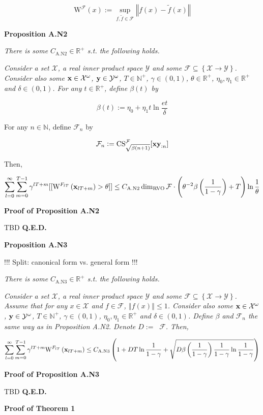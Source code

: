\documentclass[a4paper]{article}
\newcommand{\Co}[1]{}
\newcommand{\AP}[1]{\left(#1\right)}
\newcommand{\AC}[1]{\left\{#1\right\}}
\newcommand{\Nats}{\mathbb{N}}
\newcommand{\Reals}{\mathbb{R}}
\newcommand{\Norm}[1]{\left\Vert #1 \right\Vert}
\newcommand{\X}{\mathcal{X}}
\newcommand{\Y}{\mathcal{Y}}
\newcommand{\F}{\mathcal{F}}
\DeclareMathOperator{\RVO}{\dim_{RVO}}
\newcommand{\CS}{\mathrm{CS}}
\newcommand{\W}{\mathrm{W}}
\begin{document}
$$\W^\F(x):=\sup_{f,\tilde{f}\in\F}\Norm{f(x)-\tilde{f}(x)}$$  

\textbf{Proposition A.N2}\Co{b}

\textit{There is some $C_{\mathrm{A.N2}}\in\Reals^+$ s.t. the following holds.}\Co{i}

\textit{Consider a set $\X$, a real inner product space $\Y$ and some $\F\subseteq\AC{\X\rightarrow\Y}$. Consider also some $\bold{x}\in\X^\omega$, $\bold{y}\in\Y^\omega$, $T\in\Nats^+$, $\gamma\in(0,1)$, $\theta\in\Reals^+$, $\eta_0,\eta_1\in\Reals^+$ and $\delta\in(0,1)$. For any $t\in\Reals^+$, define $\beta(t)$ by}\Co{i}

$$\beta(t):=\eta_0 + \eta_1t\ln{\frac{et}{\delta}}$$

For any $n\in\Nats$, define $\F_n$ by

$$\F_n:=\CS^\F_{\sqrt{\beta(n+1)}}[\bold{xy}_{:n}]$$

Then,

$$\sum_{l=0}^\infty\sum_{m=0}^{T-1}{\gamma^{lT+m}[[\W^{F_{lT}}\AP{\bold{x}_{lT+m}}>\theta]]} \leq C_{\mathrm{A.N2}}\RVO{\F}\cdot\AP{\theta^{-2}\beta\AP{\frac{1}{1-\gamma}}+T}\ln{\frac{1}{\theta}}$$

\textbf{Proof of Proposition A.N2}\Co{b}

TBD \textbf{Q.E.D.}\Co{b}

\textbf{Proposition A.N3}\Co{b}

!!! Split: canonical form vs. general form !!!

\textit{There is some $C_{\mathrm{A.N3}}\in\Reals^+$ s.t. the following holds.}\Co{i}

\textit{Consider a set $\X$, a real inner product space $\Y$ and some $\F\subseteq\AC{\X\rightarrow\Y}$. Assume that for any $x\in\X$ and $f\in\F$, $\Norm{f(x)}\leq 1$. Consider also some $\bold{x}\in\X^\omega$, $\bold{y}\in\Y^\omega$, $T\in\Nats^+$, $\gamma\in(0,1)$, $\eta_0,\eta_1\in\Reals^+$ and $\delta\in(0,1)$. Define $\beta$ and $\F_n$ the same way as in Proposition A.N2. Denote $D:=\RVO{\F}$. Then,}\Co{i}

$$\sum_{l=0}^\infty\sum_{m=0}^{T-1}{\gamma^{lT+m}\W^{F_{lT}}\AP{\bold{x}_{lT+m}}} \leq C_{\mathrm{A.N3}}\AP{1+D T\ln\frac{1}{1-\gamma}+\sqrt{D\beta\AP{\frac{1}{1-\gamma}}\frac{1}{1-\gamma}\ln{\frac{1}{1-\gamma}}}}$$

\textbf{Proof of Proposition A.N3}\Co{b}

TBD \textbf{Q.E.D.}\Co{b}

\textbf{Proof of Theorem 1}\Co{b}
\end{document}
